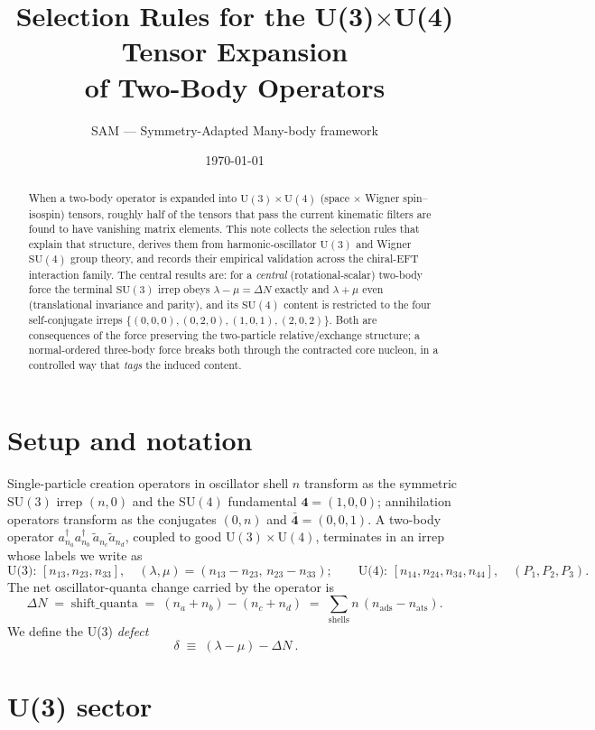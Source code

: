\documentclass[11pt]{article}
\title{\bf Selection Rules for the U(3)$\times$U(4) Tensor Expansion\\
of Two-Body Operators}
\author{SAM --- Symmetry-Adapted Many-body framework}
\date{\today}
\newcommand{\shift}{\ensuremath{\Delta N}}
\newcommand{\diff}{\ensuremath{\delta}}
\newcommand{\lm}{\ensuremath{\lambda}}
\newcommand{\mumu}{\ensuremath{\mu}}
\begin{document}
\maketitle

\begin{abstract}
When a two-body operator is expanded into $\mathrm{U}(3)\times\mathrm{U}(4)$
(space $\times$ Wigner spin--isospin) tensors, roughly half of the tensors that
pass the current kinematic filters are found to have vanishing matrix elements.
This note collects the selection rules that explain that structure, derives them
from harmonic-oscillator $\mathrm{U}(3)$ and Wigner $\mathrm{SU}(4)$ group
theory, and records their empirical validation across the chiral-EFT interaction
family. The central results are: for a \emph{central} (rotational-scalar)
two-body force the terminal $\mathrm{SU}(3)$ irrep obeys $\lm-\mumu=\shift$
exactly and $\lm+\mumu$ even (translational invariance and parity), and its
$\mathrm{SU}(4)$ content is
restricted to the four self-conjugate irreps
$\{(0,0,0),(0,2,0),(1,0,1),(2,0,2)\}$. Both are
consequences of the force preserving the two-particle relative/exchange
structure; a normal-ordered three-body force breaks both through the contracted
core nucleon, in a controlled way that \emph{tags} the induced content.
\end{abstract}

\section{Setup and notation}
Single-particle creation operators in oscillator shell $n$ transform as the
symmetric $\mathrm{SU}(3)$ irrep $(n,0)$ and the $\mathrm{SU}(4)$ fundamental
$\mathbf 4=(1,0,0)$; annihilation operators transform as the conjugates $(0,n)$
and $\bar{\mathbf 4}=(0,0,1)$. A two-body operator
$a^\dagger_{n_a}a^\dagger_{n_b}\,\tilde a_{n_c}\tilde a_{n_d}$, coupled to good
$\mathrm{U}(3)\times\mathrm{U}(4)$, terminates in an irrep whose labels we write
as
\[
\text{U(3): } [n_{13},n_{23},n_{33}],\quad
(\lm,\mumu)=(n_{13}-n_{23},\,n_{23}-n_{33}); \qquad
\text{U(4): } [n_{14},n_{24},n_{34},n_{44}],\quad
(P_1,P_2,P_3).
\]
The net oscillator-quanta change carried by the operator is
\[
\shift \;=\; \text{shift\_quanta} \;=\; (n_a+n_b)-(n_c+n_d)
      \;=\;\sum_{\text{shells}} n\,(n_{\text{ads}}-n_{\text{ats}}).
\]
We define the U(3) \emph{defect}
\[
\boxed{\ \diff \;\equiv\; (\lm-\mumu)-\shift\ }.
\]

\section{U(3) sector}
\end{document}
